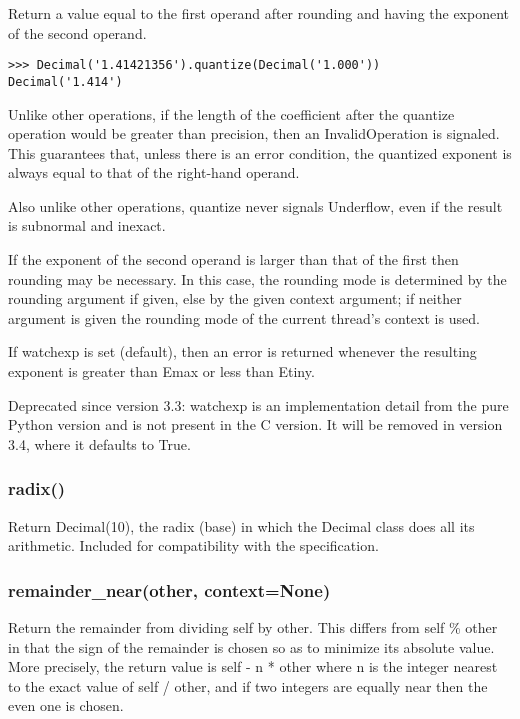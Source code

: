 Return a value equal to the first operand after rounding and having the exponent of the second operand.

\begin{lstlisting}
>>> Decimal('1.41421356').quantize(Decimal('1.000'))
Decimal('1.414')
\end{lstlisting}

Unlike other operations, if the length of the coefficient after the quantize operation would be greater than precision, then an InvalidOperation is signaled. This guarantees that, unless there is an error condition, the quantized exponent is always equal to that of the right-hand operand.

Also unlike other operations, quantize never signals Underflow, even if the result is subnormal and inexact.

If the exponent of the second operand is larger than that of the first then rounding may be necessary. In this case, the rounding mode is determined by the rounding argument if given, else by the given context argument; if neither argument is given the rounding mode of the current thread’s context is used.

If watchexp is set (default), then an error is returned whenever the resulting exponent is greater than Emax or less than Etiny.

Deprecated since version 3.3: watchexp is an implementation detail from the pure Python version and is not present in the C version. It will be removed in version 3.4, where it defaults to True.


\subsubsection{radix()}

Return Decimal(10), the radix (base) in which the Decimal class does all its arithmetic. Included for compatibility with the specification.

\subsubsection{remainder\_near(other, context=None)}

Return the remainder from dividing self by other. This differs from self \% other in that the sign of the remainder is chosen so as to minimize its absolute value. More precisely, the return value is self - n * other where n is the integer nearest to the exact value of self / other, and if two integers are equally near then the even one is chosen.

